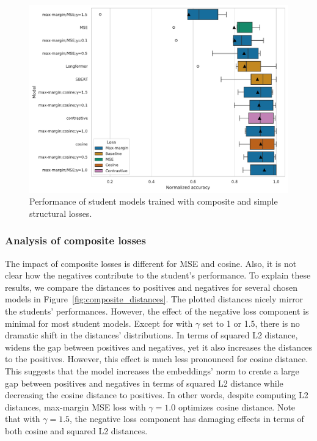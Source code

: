 \begin{figure}

  \includegraphics[width=\textwidth]{./img/structural_both_losses.pdf}

  \caption{Performance of student models trained with composite and simple
  structural losses.}

  \label{fig:structural_composite_vs_simple}
\end{figure}

\subsubsection{Analysis of composite losses}\label{section:composite_analysis}

The impact of composite losses is different for MSE and cosine. Also, it is not
clear how the negatives contribute to the student's performance. To explain
these results, we compare the distances to positives and negatives for several
chosen models in Figure~\ref{fig:composite_distances}. The plotted distances
nicely mirror the students' performances. However, the effect of the negative
loss component is minimal for most student models. Except for
 with $\gamma$ set to 1 or 1.5, there is no dramatic
shift in the distances' distributions. In terms of squared L2 distance,
 widens the gap between positives and
negatives, yet it also increases the distances to the positives. However, this
effect is much less pronounced for cosine distance. This suggests that the
model increases the embeddings' norm to create a large gap between positives
and negatives in terms of squared L2 distance while decreasing the cosine
distance to positives. In other words, despite computing L2 distances,
max-margin MSE loss with $\gamma=1.0$ optimizes cosine distance. Note that with
$\gamma=1.5$, the negative loss component has damaging effects in terms of both
cosine and squared L2 distances.

